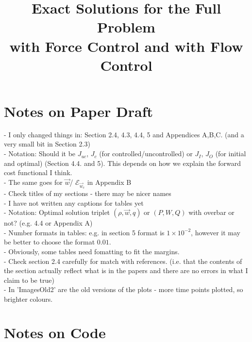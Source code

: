 \documentclass[11pt, a4paper]{article}
\title{Exact Solutions for the Full Problem \\with Force Control and with Flow Control}
\date{}
\theoremstyle{definition}
\begin{document}
\section*{Notes on Paper Draft}
- I only changed things in: Section 2.4, 4.3, 4.4, 5 and Appendices A,B,C. (and a very small bit in Section 2.3)\\
- Notation: Should it be $J_{uc}$, ${J_c}$ (for controlled/uncontrolled) or $J_I$, $J_O$ (for initial and optimal) (Section 4.4. and 5). This depends on how we explain the forward cost functional I think.\\
- The same goes for $\vec{w}$/ $\mathcal{E}_{\vec{w}_c}$ in Appendix B\\
- Check titles of my sections - there may be nicer names\\
- I have not written any captions for tables yet\\
- Notation: Optimal solution triplet $(\rho,\vec{w},q)$ or $(P,W,Q)$ with overbar or not? (e.g. 4.4 or Appendix A)\\
- Number formats in tables: e.g. in section 5 format is $1 \times 10^{-2}$, however it may be better to choose the format $0.01$.\\
- Obviously, some tables need fomatting to fit the margins.\\
- Check section 2.4 carefully for match with references. (i.e. that the contents of the section actually reflect what is in the papers and there are no errors in what I claim to be true)\\
- In 'ImagesOld2' are the old versions of the plots - more time points plotted, so brighter colours.

\section*{Notes on Code}
\end{document}
